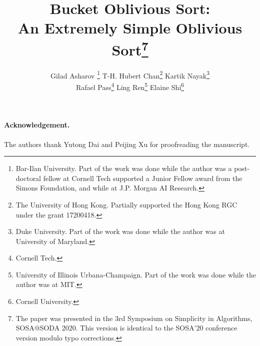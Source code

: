 \documentclass[11pt,letterpaper]{article}
\theoremstyle{boxes}
\begin{document}
\title{\bf Bucket Oblivious Sort: \\An Extremely Simple Oblivious Sort\thanks{The paper was presented in the 3rd Symposium on Simplicity in Algorithms, SOSA@SODA 2020. This version is identical
to the SOSA'20 conference version modulo typo corrections.
}}

\author{Gilad Asharov \thanks{Bar-Ilan University. Part of the work was done while the author was a post-doctoral fellow at Cornell Tech supported a Junior Fellow award from the Simons Foundation, and while at J.P. Morgan AI Research.} \qquad
T-H. Hubert Chan\thanks{The University of Hong Kong. Partially supported the Hong Kong RGC under the grant 17200418.} \qquad
Kartik Nayak\thanks{Duke University. Part of the work was done while the author was at University of Maryland.} \\
Rafael Pass\thanks{Cornell Tech.} \qquad
Ling Ren\thanks{University of Illinois Urbana-Champaign. Part of the work was done while the author was at MIT.} \qquad
Elaine Shi\thanks{Cornell University.}}

\newcommand{\rl}[1]{{\footnotesize\color{orange}[Ling: #1]}}

\date{}

\maketitle


\begin{abstract}

\end{abstract}






\paragraph{Acknowledgement.} The authors thank Yutong Dai and Peijing Xu for proofreading the manuscript.



%


\appendix

%
\end{document}
